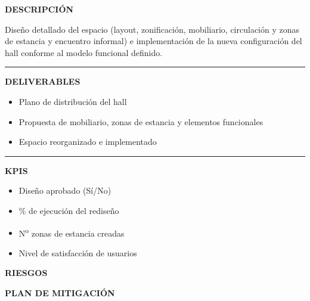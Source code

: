 \documentclass[11pt,a4paper]{scrreprt}
\newcommand{\fieldlabel}[1]{%
  {\footnotesize\sffamily\bfseries\color{mutedcolor}\MakeUppercase{#1}}\par\nopagebreak[4]
}
\newcommand{\fieldsep}{\vspace{3pt}\noindent\textcolor{bordercolor}{\rule{\linewidth}{0.4pt}}\vspace{3pt}\par}
\begin{document}
\begin{tcolorbox}[pabox={espcolor}{PA1.2 \enspace\textbullet\enspace Diseño e implementación de la distribución y las zonas de estancia del hall}]

\fieldlabel{Descripci\'on}
{\small Diseño detallado del espacio (layout, zonificación, mobiliario, circulación y zonas de estancia y encuentro informal) e implementación de la nueva configuración del hall conforme al modelo funcional definido.}\par
\fieldsep
\fieldlabel{Deliverables}
{\small \begin{itemize}[noitemsep,topsep=2pt]
\item Plano de distribución del hall
\item Propuesta de mobiliario, zonas de estancia y elementos funcionales
\item Espacio reorganizado e implementado
\end{itemize}}\par
\fieldsep
\fieldlabel{KPIs}
{\small \begin{itemize}[noitemsep,topsep=2pt]
\item Diseño aprobado (Sí/No)
\item \% de ejecución del rediseño
\item N\textsuperscript{o} zonas de estancia creadas
\item Nivel de satisfacción de usuarios
\end{itemize}}\par
\end{tcolorbox}
\begin{tcolorbox}[riskbox]
{\footnotesize\sffamily\bfseries\color{red!50!black} RIESGOS}\par{}
\end{tcolorbox}
\begin{tcolorbox}[mitbox]
{\footnotesize\sffamily\bfseries\color{green!40!black} PLAN DE MITIGACI\'ON}\par{}
\end{tcolorbox}
\vspace{8pt}
\end{document}
